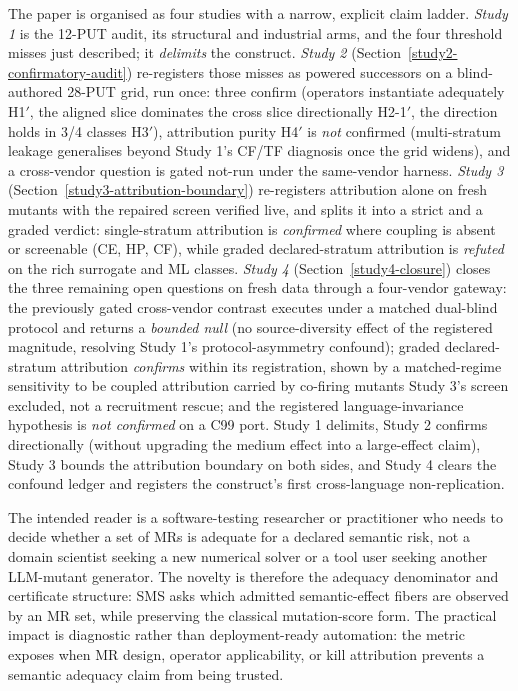 \documentclass[manuscript,screen,review]{acmart}
\begin{document}
The paper is organised as four studies with a narrow, explicit claim ladder.
\emph{Study 1} is the 12-PUT audit, its structural and industrial arms, and the
four threshold misses just described; it \emph{delimits} the construct.
\emph{Study 2} (Section~\ref{study2-confirmatory-audit}) re-registers those
misses as powered successors on a blind-authored 28-PUT grid, run once: three
confirm (operators instantiate adequately H1\('\), the aligned slice dominates
the cross slice directionally H2-1\('\), the direction holds in 3/4 classes
H3\('\)), attribution purity H4\('\) is \emph{not} confirmed (multi-stratum
leakage generalises beyond Study 1's CF/TF diagnosis once the grid widens), and
a cross-vendor question is gated not-run under the same-vendor harness.
\emph{Study 3} (Section~\ref{study3-attribution-boundary}) re-registers
attribution alone on fresh mutants with the repaired screen verified live, and
splits it into a strict and a graded verdict: single-stratum attribution is
\emph{confirmed} where coupling is absent or screenable (CE, HP, CF), while
graded declared-stratum attribution is \emph{refuted} on the rich surrogate and
ML classes. \emph{Study 4} (Section~\ref{study4-closure}) closes the three
remaining open questions on fresh data through a four-vendor gateway: the
previously gated cross-vendor contrast executes under a matched dual-blind
protocol and returns a \emph{bounded null} (no source-diversity effect of the
registered magnitude, resolving Study 1's protocol-asymmetry confound); graded
declared-stratum attribution \emph{confirms} within its registration, shown
by a matched-regime sensitivity to be coupled attribution carried by
co-firing mutants Study 3's screen excluded, not a recruitment rescue; and
the registered language-invariance hypothesis is \emph{not confirmed} on a
C99 port. Study 1
delimits, Study 2 confirms directionally (without upgrading the medium effect
into a large-effect claim), Study 3 bounds the attribution boundary on both
sides, and Study 4 clears the confound ledger and registers the construct's
first cross-language non-replication.

The intended reader is a software-testing researcher or practitioner who
needs to decide whether a set of MRs is adequate for a declared semantic
risk, not a domain scientist seeking a new numerical solver or a tool
user seeking another LLM-mutant generator. The novelty is therefore the
adequacy denominator and certificate structure: SMS asks which admitted
semantic-effect fibers are observed by an MR set, while preserving the
classical mutation-score form. The practical impact is diagnostic rather
than deployment-ready automation: the metric exposes when MR design,
operator applicability, or kill attribution prevents a semantic adequacy
claim from being trusted.
\end{document}
